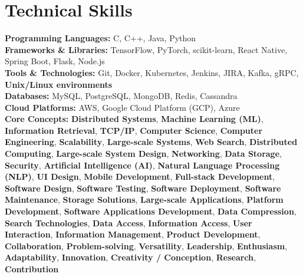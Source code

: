 \documentclass[11pt,a4paper,sans]{article}
\begin{document}
\section*{Technical Skills}
\textbf{Programming Languages:} C, C++, Java, Python \\
\textbf{Frameworks \& Libraries:} TensorFlow, PyTorch, scikit-learn, React Native, Spring Boot, Flask, Node.js \\
\textbf{Tools \& Technologies:} Git, Docker, Kubernetes, Jenkins, JIRA, Kafka, gRPC, \textbf{Unix/Linux environments} \\
\textbf{Databases:} MySQL, PostgreSQL, MongoDB, Redis, Cassandra \\
\textbf{Cloud Platforms:} AWS, Google Cloud Platform (GCP), Azure \\
\textbf{Core Concepts:} \textbf{Distributed Systems}, \textbf{Machine Learning (ML)}, \textbf{Information Retrieval}, \textbf{TCP/IP}, \textbf{Computer Science}, \textbf{Computer Engineering}, \textbf{Scalability}, \textbf{Large-scale Systems}, \textbf{Web Search}, \textbf{Distributed Computing}, \textbf{Large-scale System Design}, \textbf{Networking}, \textbf{Data Storage}, \textbf{Security}, \textbf{Artificial Intelligence (AI)}, \textbf{Natural Language Processing (NLP)}, \textbf{UI Design}, \textbf{Mobile Development}, \textbf{Full-stack Development}, \textbf{Software Design}, \textbf{Software Testing}, \textbf{Software Deployment}, \textbf{Software Maintenance}, \textbf{Storage Solutions}, \textbf{Large-scale Applications}, \textbf{Platform Development}, \textbf{Software Applications Development}, \textbf{Data Compression}, \textbf{Search Technologies}, \textbf{Data Access}, \textbf{Information Access}, \textbf{User Interaction}, \textbf{Information Management}, \textbf{Product Development}, \textbf{Collaboration}, \textbf{Problem-solving}, \textbf{Versatility}, \textbf{Leadership}, \textbf{Enthusiasm}, \textbf{Adaptability}, \textbf{Innovation}, \textbf{Creativity / Conception}, \textbf{Research}, \textbf{Contribution}
\end{document}
